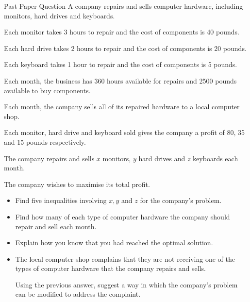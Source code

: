 \documentclass[8pt]{beamer}
\begin{document}
\begin{frame}{Past Paper Question}
	A company repairs and sells computer hardware, including monitors, hard drives and keyboards.

	Each monitor takes 3 hours to repair and the cost of components is 40 pounds.

	Each hard drive takes 2 hours to repair and the cost of components is 20 pounds.

	Each keyboard takes 1 hour to repair and the cost of components is 5 pounds.

	Each month, the business has 360 hours available for repairs and 2500 pounds available to buy components.

	Each month, the company sells all of its repaired hardware to a local computer shop.

	Each monitor, hard drive and keyboard sold gives the company a profit of 80, 35 and 15 pounds respectively.

	The company repairs and sells $x$ monitors, $y$ hard drives and $z$ keyboards each month.

	The company wishes to maximise its total profit.

	\begin{problem}
		\begin{itemize}
			\item Find five inequalities involving $x,y$ and $z$ for the company's problem.
			\item Find how many of each type of computer hardware the company should repair and sell each month.
			\item Explain how you know that you had reached the optimal solution.
			\item The local computer shop complains that they are not receiving one of the types of computer hardware that the company repairs and sells.

				Using the previous answer, suggest a way in which the company's problem can be modified to address the complaint.
		\end{itemize}
	\end{problem}
\end{frame}
\end{document}
